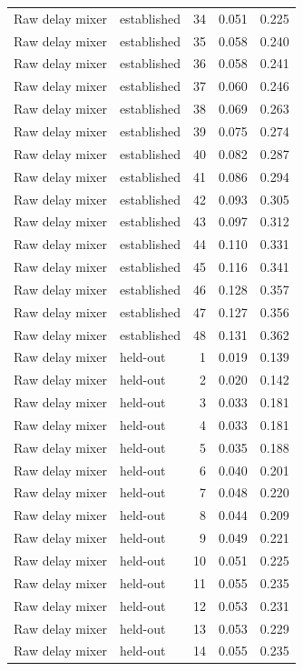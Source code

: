 \begin{tabular}{llrrr}
Raw delay mixer & established & 34 & 0.051 & 0.225 \\
Raw delay mixer & established & 35 & 0.058 & 0.240 \\
Raw delay mixer & established & 36 & 0.058 & 0.241 \\
Raw delay mixer & established & 37 & 0.060 & 0.246 \\
Raw delay mixer & established & 38 & 0.069 & 0.263 \\
Raw delay mixer & established & 39 & 0.075 & 0.274 \\
Raw delay mixer & established & 40 & 0.082 & 0.287 \\
Raw delay mixer & established & 41 & 0.086 & 0.294 \\
Raw delay mixer & established & 42 & 0.093 & 0.305 \\
Raw delay mixer & established & 43 & 0.097 & 0.312 \\
Raw delay mixer & established & 44 & 0.110 & 0.331 \\
Raw delay mixer & established & 45 & 0.116 & 0.341 \\
Raw delay mixer & established & 46 & 0.128 & 0.357 \\
Raw delay mixer & established & 47 & 0.127 & 0.356 \\
Raw delay mixer & established & 48 & 0.131 & 0.362 \\
Raw delay mixer & held-out & 1 & 0.019 & 0.139 \\
Raw delay mixer & held-out & 2 & 0.020 & 0.142 \\
Raw delay mixer & held-out & 3 & 0.033 & 0.181 \\
Raw delay mixer & held-out & 4 & 0.033 & 0.181 \\
Raw delay mixer & held-out & 5 & 0.035 & 0.188 \\
Raw delay mixer & held-out & 6 & 0.040 & 0.201 \\
Raw delay mixer & held-out & 7 & 0.048 & 0.220 \\
Raw delay mixer & held-out & 8 & 0.044 & 0.209 \\
Raw delay mixer & held-out & 9 & 0.049 & 0.221 \\
Raw delay mixer & held-out & 10 & 0.051 & 0.225 \\
Raw delay mixer & held-out & 11 & 0.055 & 0.235 \\
Raw delay mixer & held-out & 12 & 0.053 & 0.231 \\
Raw delay mixer & held-out & 13 & 0.053 & 0.229 \\
Raw delay mixer & held-out & 14 & 0.055 & 0.235 \\

\end{tabular}
